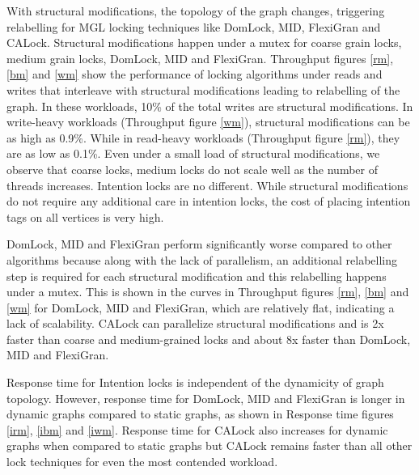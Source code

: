 With structural modifications, the topology of the graph changes, triggering relabelling for MGL locking techniques like DomLock, MID, FlexiGran and CALock. 
Structural modifications happen under a mutex for coarse grain locks, medium grain locks, DomLock, MID and FlexiGran. 
Throughput figures \ref{rm}, \ref{bm} and \ref{wm} show the performance of locking algorithms under reads and writes that interleave with structural modifications leading to relabelling of the graph.
In these workloads, 10\% of the total writes are structural modifications.
In write-heavy workloads (Throughput figure \ref{wm}), structural modifications can be as high as 0.9\%. 
While in read-heavy workloads (Throughput figure \ref{rm}), they are as low as 0.1\%.
Even under a small load of structural modifications, we observe that coarse locks, medium locks do not scale well as the number of threads increases. Intention locks are no different. While structural modifications do not require any additional care in intention locks, the cost of placing intention tags on all vertices is very high.

DomLock, MID and FlexiGran perform significantly worse compared to other algorithms because along with the lack of parallelism, an additional relabelling step is required for each structural modification and this relabelling happens under a mutex.
This is shown in the curves in Throughput figures \ref{rm}, \ref{bm} and \ref{wm} for DomLock, MID and FlexiGran, which are relatively flat, indicating a lack of scalability. CALock can parallelize structural modifications and is 2x faster than coarse and medium-grained locks and about 8x faster than DomLock, MID and FlexiGran.

Response time for Intention locks is independent of the dynamicity of graph topology. However, response time for DomLock, MID and FlexiGran is longer in dynamic graphs compared to static graphs, as shown in Response time figures \ref{irm}, \ref{ibm} and \ref{iwm}.
Response time for CALock also increases for dynamic graphs when compared to static graphs but CALock remains faster than all other lock techniques for even the most contended workload.



